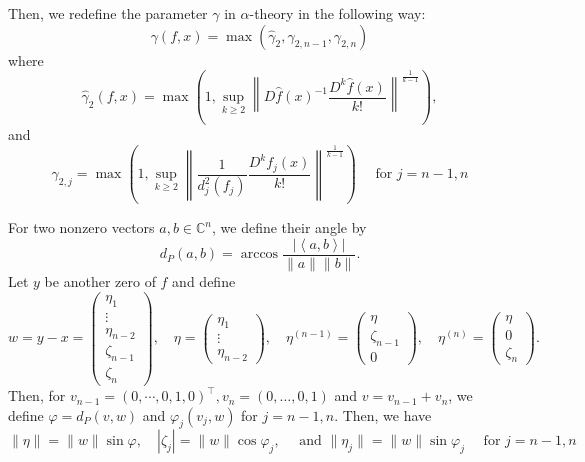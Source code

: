 \documentclass[12pt,oneside,reqno]{amsart}
\theoremstyle{definition}
\begin{document}
Then, we redefine the parameter $\gamma$ in $\alpha$-theory in the following way:
$$\gamma(f,x)=\max(\hat{\gamma}_2,\gamma_{2,n-1},\gamma_{2,n})$$
where
\[\hat{\gamma}_2(f,x)=\max\left(1,\sup\limits_{k\geq 2}\left\|D\hat{f}(x)^{-1}\frac{D^k\hat{f}(x)}{k!}\right\|^{\frac{1}{k-1}}\right),\]
and
\[\gamma_{2,j}=\max\left(1,\sup\limits_{k\geq 2}\left\|\frac{1}{d_j^2(f_j)}\frac{D^k f_j(x)}{k!}\right\|^{\frac{1}{k-1}}\right)\quad \text{ for } j=n-1,n\]

For two nonzero vectors $a,b\in \mathbb{C}^n$, we define their angle by
\[d_P(a,b)=\arccos\frac{|\left<a,b\right>|}{\|a\|\|b\|}.\]
Let $y$ be another zero of $f$ and define
\[w=y-x=\left(\begin{array}{c}
\eta_1\\
\vdots\\
\eta_{n-2}\\
\zeta_{n-1}\\
\zeta_n
\end{array}\right),\quad \eta=\left(\begin{array}{c}
\eta_1\\
\vdots\\
\eta_{n-2}
\end{array}\right),\quad\eta^{(n-1)}=\left(\begin{array}{c}
\eta\\
\zeta_{n-1}\\
0
\end{array}\right),\quad \eta^{(n)}=\left(\begin{array}{c}
\eta\\
0\\
\zeta_{n}
\end{array}\right).\]
Then, for $v_{n-1}=(0,\cdots,0,1,0)^\top, v_n=(0,\dots,0,1)$ and $v=v_{n-1}+v_n$, we define $\varphi=d_P(v,w)$ and $\varphi_j(v_j,w)$ for $j=n-1,n$. Then, we have
\[\|\eta\|=\|w\|\sin\varphi,\quad |\zeta_j|=\|w\|\cos\varphi_j,\quad\text{ and }\|\eta_j\|=\|w\|\sin\varphi_j \quad\text{ for }j=n-1,n\]
\end{document}
